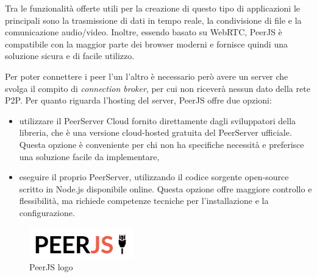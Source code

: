Tra le funzionalità offerte utili per la creazione di questo tipo di applicazioni le principali sono la trasmissione di dati in tempo reale, la condivisione di file e la comunicazione audio/video. Inoltre, essendo basato su WebRTC, PeerJS è compatibile con la maggior parte dei browser moderni e fornisce quindi una soluzione sicura e di facile utilizzo.

Per poter connettere i peer l'un l'altro è necessario però avere un server che svolga il compito di \emph{connection broker}, per cui non riceverà nessun dato della rete P2P. Per quanto riguarda l'hosting del server, PeerJS offre due opzioni:
\begin{itemize}
    \item utilizzare il PeerServer Cloud fornito direttamente dagli sviluppatori della libreria, che è una versione cloud-hosted gratuita del PeerServer ufficiale. Questa opzione è conveniente per chi non ha specifiche necessità e preferisce una soluzione facile da implementare,
    \item eseguire il proprio PeerServer, utilizzando il codice sorgente open-source scritto in Node.js disponibile online. Questa opzione offre maggiore controllo e flessibilità, ma richiede competenze tecniche per l'installazione e la configurazione.
\end{itemize}

\begin{figure}[H]
\centering
\includegraphics[width=0.4\textwidth]{img/logos/peerjs_logo.png}
\caption{PeerJS logo}
\label{fig:peerjs}
\end{figure}